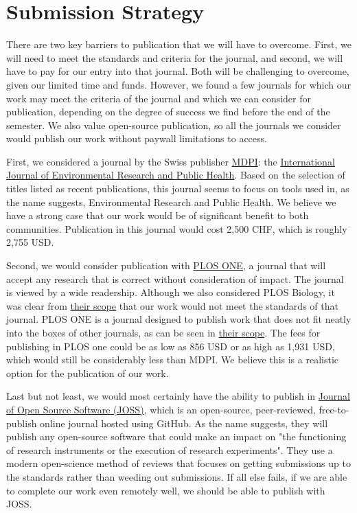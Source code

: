 \section{Submission Strategy}

There are two key barriers to publication that we will have to overcome. First, we will need to meet the standards and criteria for the journal, and second, we will have to pay for our entry into that journal. Both will be challenging to overcome, given our limited time and funds. However, we found a few journals for which our work may meet the criteria of the journal and which we can consider for publication, depending on the degree of success we find before the end of the semester. We also value open-source publication, so all the journals we consider would publish our work without paywall limitations to access.

First, we considered a journal by the Swiss publisher \href{https://www.mdpi.com/}{MDPI}: the \href{https://www.mdpi.com/journal/ijerph}{International Journal of Environmental Research and Public Health}. Based on the selection of titles listed as recent publications, this journal seems to focus on tools used in, as the name suggests, Environmental Research and Public Health. We believe we have a strong case that our work would be of significant benefit to both communities. Publication in this journal would cost 2,500 CHF, which is roughly 2,755 USD.

Second, we would consider publication with \href{https://journals.plos.org/plosone/s/journal-information}{PLOS ONE}, a journal that will accept any research that is correct without consideration of impact. The journal is viewed by a wide readership. Although we also considered PLOS Biology, it was clear from \href{https://journals.plos.org/plosbiology/s/journal-information#loc-scope}{their scope} that our work would not meet the standards of that journal. PLOS ONE is a journal designed to publish work that does not fit neatly into the boxes of other journals, as can be seen in \href{https://journals.plos.org/plosone/s/journal-information#loc-scope}{their scope}. The fees for publishing in PLOS one could be as low as 856 USD or as high as 1,931 USD, which would still be considerably less than MDPI. We believe this is a realistic option for the publication of our work.

Last but not least, we would most certainly have the ability to publish in \href{https://joss.theoj.org/}{Journal of Open Source Software (JOSS)}, which is an open-source, peer-reviewed, free-to-publish online journal hosted using GitHub. As the name suggests, they will publish any open-source software that could make an impact on "the functioning of research instruments or the execution of research experiments". They use a modern open-science method of reviews that focuses on getting submissions up to the standards rather than weeding out submissions. If all else fails, if we are able to complete our work even remotely well, we should be able to publish with JOSS.

